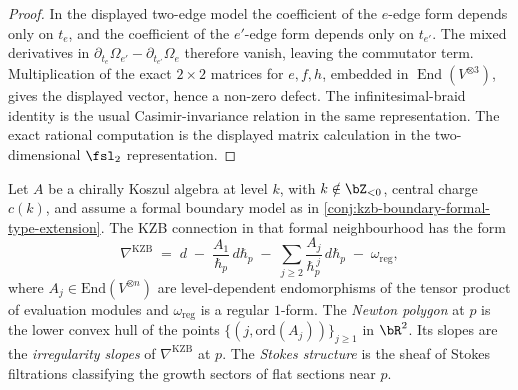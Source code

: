 \begin{proof}
In the displayed two-edge model the coefficient of the \(e\)-edge
form depends only on \(t_e\), and the coefficient of the \(e'\)-edge
form depends only on \(t_{e'}\). The mixed derivatives in
\(\partial_{t_e}\Omega_{e'}-\partial_{t_{e'}}\Omega_e\) therefore
vanish, leaving the commutator term. Multiplication of the exact
\(2\times2\) matrices for \(e,f,h\), embedded in
\(\operatorname{End}(V^{\otimes3})\), gives the displayed vector,
hence a non-zero defect. The infinitesimal-braid identity is the
usual Casimir-invariance relation in the same representation. The
exact rational computation is the displayed matrix calculation in
the two-dimensional $\fsl_2$ representation.
\end{proof}

\begin{definition}
\label{def:newton-stokes}
Let \(A\) be a chirally Koszul algebra at level \(k\), with
\(k \notin \bZ_{<0}\), central charge \(c(k)\), and assume a
formal boundary model as in
\autoref{conj:kzb-boundary-formal-type-extension}. The KZB
connection in that formal neighbourhood has the form
\[
 \nabla^{\mathrm{KZB}}
 \;=\;
 d
 \;-\;
 \frac{A_{1}}{\hbar_{p}}\,d\hbar_{p}
 \;-\;
 \sum_{j \ge 2}
 \frac{A_{j}}{\hbar_{p}^{\,j}}\,d\hbar_{p}
 \;-\;
 \omega_{\mathrm{reg}},
\]
where \(A_{j} \in \mathrm{End}(V^{\otimes n})\) are level-dependent
endomorphisms of the tensor product of evaluation modules and
\(\omega_{\mathrm{reg}}\) is a regular \(1\)-form.
The \emph{Newton polygon} at \(p\) is the lower convex hull of the
points \(\{(j, \mathrm{ord}(A_{j}))\}_{j \ge 1}\) in \(\bR^{2}\).
Its slopes are the \emph{irregularity slopes} of
\(\nabla^{\mathrm{KZB}}\) at \(p\). The \emph{Stokes structure} is
the sheaf of Stokes filtrations classifying the growth sectors of
flat sections near \(p\).
\end{definition}

